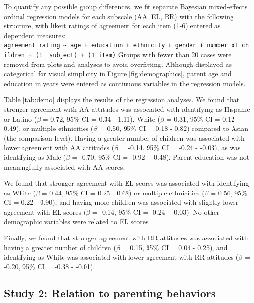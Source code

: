\documentclass[man]{apa6}
\theoremstyle{definition}
\theoremstyle{definition}
\theoremstyle{definition}
\theoremstyle{remark}
\begin{document}
To quantify any possible group differences, we fit separate Bayesian
mixed-effects ordinal regression models for each subscale (AA, EL, RR)
with the following structure, with likert ratings of agreement for each
item (1-6) entered as dependent measures:
\texttt{agreement\ rating\ \textasciitilde{}\ age\ +\ education\ +\ ethnicity\ +\ gender\ +\ number\ of\ children\ +\ (1\ \textbar{}\ subject)\ +\ (1\textbar{}\ item)}
Groups with fewer than 20 cases were removed from plots and analyses to
avoid overfitting. Although displayed as categorical for visual
simplicity in Figure \ref{fig:demographics}, parent age and education in
years were entered as continuous variables in the regression models.

Table \ref{tab:demo} displays the results of the regression analyses. We
found that stronger agreement with AA attitudes was associated with
identifying as Hispanic or Latino (\(\beta\) = 0.72, 95\% CI = 0.34 -
1.11), White (\(\beta\) = 0.31, 95\% CI = 0.12 - 0.49), or multiple
ethnicities (\(\beta\) = 0.50, 95\% CI = 0.18 - 0.82) compared to Asian
(the comparison level). Having a greater number of children was
associated with lower agreement with AA attitudes (\(\beta\) = -0.14,
95\% CI = -0.24 - -0.03), as was identifying as Male (\(\beta\) = -0.70,
95\% CI = -0.92 - -0.48). Parent education was not meaningfully
associated with AA scores.

We found that stronger agreement with EL scores was associated with
identifying as White (\(\beta\) = 0.44, 95\% CI = 0.25 - 0.62) or
multiple ethnicities (\(\beta\) = 0.56, 95\% CI = 0.22 - 0.90), and
having more children was associated with slightly lower agreement with
EL scores (\(\beta\) = -0.14, 95\% CI = -0.24 - -0.03). No other
demographic variables were related to EL scores.

Finally, we found that stronger agreement with RR attitudes was
associated with having a greater number of children (\(\beta\) = 0.15,
95\% CI = 0.04 - 0.25), and identifying as White was associated with
lower agreement with RR attitudes (\(\beta\) = -0.20, 95\% CI = -0.38 -
-0.01).

\subsection{Study 2: Relation to parenting
behaviors}\label{study-2-relation-to-parenting-behaviors}
\end{document}
